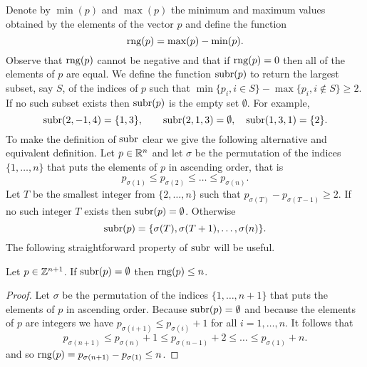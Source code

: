 \documentclass[final,leqno]{siamltex}
\begin{document}
Denote by $\min(p)$ and $\max(p)$ the minimum and maximum values obtained by the elements of the vector $p$ and define the function
\[
\operatorname{rng}(p) = \max(p) - \min(p).
\] 
Observe that $\operatorname{rng}(p)$ cannot be negative and that if $\operatorname{rng}(p) = 0$ then all of the elements of $p$ are equal.  We define the function $\operatorname{subr}(p)$ to return the largest subset, say $S$, of the indices of $p$ such that $\min\{p_i, i \in S\} - \max\{p_i, i \notin S\} \geq 2.$  If no such subset exists then $\operatorname{subr}(p)$ is the empty set $\emptyset$.  For example, 
\[
\operatorname{subr}(2,-1,4) = \{1,3\}, \qquad \operatorname{subr}(2,1,3) = \emptyset, \quad  \operatorname{subr}(1,3,1) = \{2\}.
\]  
To make the definition of $\operatorname{subr}$ clear we give the following alternative and equivalent definition.  Let $p \in {\mathbb R}^n$ and let $\sigma$ be the permutation of the indices $\{1,\dots,n\}$ that puts the elements of $p$ in ascending order, that is
\[
p_{\sigma(1)} \leq p_{\sigma(2)} \leq \dots \leq p_{\sigma(n)}.
\]  
Let $T$ be the smallest integer from $\{2,\dots,n\}$ such that $p_{\sigma(T)} - p_{\sigma(T-1)} \geq 2$.  If no such integer $T$ exists then $\operatorname{subr}(p) = \emptyset$.  Otherwise 
\[
\operatorname{subr}(p) =  \{ \sigma(T), \sigma(T+1), \dots, \sigma(n) \}.
\]
The following straightforward property of $\operatorname{subr}$ will be useful.

\begin{proposition}\label{prop:subrrngsmall}
Let $p \in {\mathbb Z}^{n+1}$.  If $\operatorname{subr}(p) = \emptyset$ then $\operatorname{rng}(p) \leq n$.
\end{proposition}
\begin{proof}
Let $\sigma$ be the permutation of the indices $\{1,\dots,n+1\}$ that puts the elements of $p$ in ascending order.  Because $\operatorname{subr}(p) = \emptyset$ and because the elements of $p$ are integers we have $p_{\sigma(i+1)} \leq p_{\sigma(i)} + 1$ for all $i=1,\dots,n$.  It follows that
\[
p_{\sigma(n+1)} \leq p_{\sigma(n)} + 1 \leq p_{\sigma(n-1)} + 2 \leq \dots \leq p_{\sigma(1)} + n.
\]
and so $\operatorname{rng}(p) = p_{\sigma(n+1)} - p_{\sigma(1)} \leq n$.
\end{proof}
\end{document}
